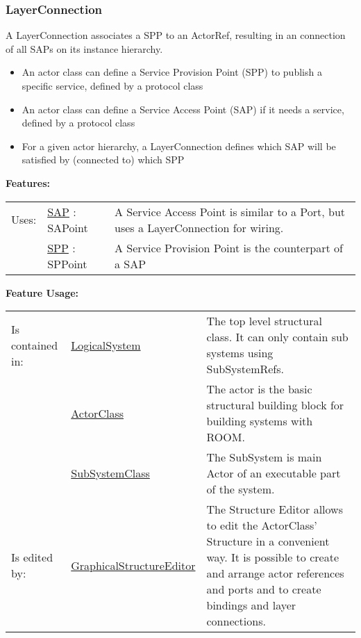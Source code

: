 		
	
	\vspace{\baselineskip}
	\vspace{\baselineskip}
	\vspace{\baselineskip}
	
\subsubsection{LayerConnection}
	\hypertarget{ref:LayerConnection}{}
	A LayerConnection associates a SPP to an ActorRef, resulting in an connection of all SAPs on its instance hierarchy.
		
	\begin{itemize}
	\item An actor class can define a Service Provision Point (SPP) to publish a specific service, defined by a protocol class
	\item An actor class can define a Service Access Point (SAP) if it needs a service, defined by a protocol class
	\item For a given actor hierarchy, a LayerConnection defines which SAP will be satisfied by (connected to) which SPP
	\end{itemize}
		
		
	\begingroup
	\textbf{Features:}
	\renewcommand{\arraystretch}{1.8} %
	\begin{longtable}{l|l p{}}
		\hline
	Uses: & \tabitem \hyperlink{ref:SAP}{SAP} : SAPoint & A Service Access Point is similar to a Port, but uses a LayerConnection for wiring.\\
	& \tabitem \hyperlink{ref:SPP}{SPP} : SPPoint & A Service Provision Point is the counterpart of a SAP \\
	\hline
	\end{longtable}
	\endgroup
		
	\begingroup
	\textbf{Feature Usage:}
	\renewcommand{\arraystretch}{1.8} %
	\begin{longtable}{l|l p{}}
		\hline
	Is contained in: & \tabitem \hyperlink{ref:LogicalSystem}{LogicalSystem}  & The top level structural class. It can only contain sub systems using SubSystemRefs.\\
	& \tabitem \hyperlink{ref:ActorClass}{ActorClass}  & The actor is the basic structural building block for building systems with ROOM. \\
	& \tabitem \hyperlink{ref:SubSystemClass}{SubSystemClass}  & The SubSystem is main Actor of an executable part of the system.  \\
	\hline
	Is edited by: & \tabitem \hyperlink{ref:GraphicalStructureEditor}{GraphicalStructureEditor}  & The Structure Editor allows to edit the ActorClass' Structure in a convenient way. It is possible to create and arrange actor references and ports and to create bindings and layer connections.\\
	\hline
	\end{longtable}
	\endgroup
		
